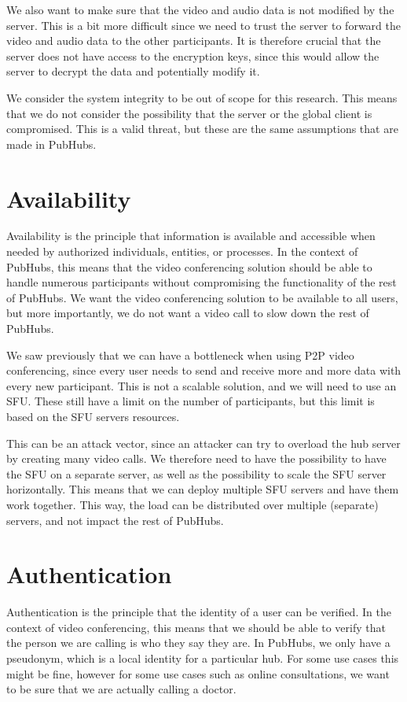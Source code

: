 \documentclass{report}
\begin{document}
We also want to make sure that the video and audio data is not modified by the server. This is a bit more difficult
since we need to trust the server to forward the video and audio data to the other participants. It is therefore crucial
that the server does not have access to the encryption keys, since this would allow the server to decrypt the data and
potentially modify it.

We consider the system integrity to be out of scope for this research. This means that we do not consider the
possibility that the server or the global client is compromised. This is a valid threat, but these are the same
assumptions
that are made in PubHubs.

\section{Availability}
Availability is the principle that information is available and accessible when needed by authorized individuals,
entities, or processes. In the context of PubHubs, this means that the video conferencing solution should be able to
handle numerous participants without compromising the functionality of the rest of PubHubs. We want the
video conferencing solution to be available to all users, but more importantly, we do not want a video call to slow
down the rest of PubHubs.

We saw previously that we can have a bottleneck when using P2P video conferencing, since every user needs to send
and receive more and more data with every new participant. This is not a scalable solution, and we will need to use
an SFU. These still have a limit on the number of participants, but this limit is based on the SFU servers resources.

This can be an attack vector, since an attacker can try to overload the hub server by creating many video
calls. We therefore need to have the possibility to have the SFU on a separate server, as well as the possibility to
scale the SFU server horizontally. This means that we can deploy multiple SFU servers and have them work together.
This way, the load can be distributed over multiple (separate) servers, and not impact the rest of PubHubs.

\section{Authentication}
Authentication is the principle that the identity of a user can be verified. In the context of video conferencing,
this means that we should be able to verify that the person we are calling is who they say they are. In PubHubs, we
only have a pseudonym, which is a local identity for a particular hub. For some use cases this might be fine, however
for some use cases such as online consultations, we want to be sure that we are actually calling a doctor.
\end{document}
